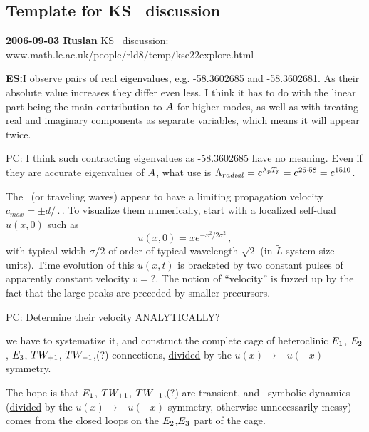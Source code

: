 \subsection{Template for KS \eqva\ discussion}

\noindent
{\bf 2006-09-03 Ruslan}
KS \eqva\ discussion:
\\
{www.math.le.ac.uk/people/rld8/temp/kse22explore.html}

{\bf ES:}{I observe pairs of real eigenvalues,
e.g. -58.3602685 and -58.3602681. As their absolute
value increases they differ even less.
I think it has to do with the linear part being the main
contribution to $A$ for higher modes, as well as
with treating real and imaginary components
as separate variables, which means it will appear twice.
        }

PC: {I think such contracting eigenvalues as -58.3602685 have no meaning.
Even if they are accurate eigenvalues of $A$,
what use is
$\Lambda_{radial} =  e^{\lambda_p {T_{p}}} = e^{26\cdot58} = e^{1510}$.
        }

The \reqva\ (or traveling waves) appear to have a limiting propagation
velocity $c_{max} = \pm d/\period{}$.
To visualize them numerically,
start with a localized self-dual $u(x,0)$ such as
\[
u(x,0) = x e^{- x^2/2\sigma^2}
\,,
\]
with typical width $\sigma/2$ of order of typical wavelength
$\sqrt{2}$ (in $\tilde{L}$ system size units).
Time evolution of this  $u(x,t)$ is bracketed by two constant
pulses of apparently constant velocity $v=?$.
The notion of ``velocity''
is fuzzed up by the fact that the large peaks are preceded
by smaller precursors.

PC: {Determine their velocity ANALYTICALLY?}

we have to systematize it, and
construct the complete cage of heteroclinic $E_{1}$, $E_{2}$, $E_{3}$,
$TW_{+1}$,
$TW_{-1}$,(?)
connections, \underline{divided} by the $u(x) \to - u(-x)$ symmetry.

The hope is that $E_{1}$,
$TW_{+1}$,
$TW_{-1}$,(?) are transient, and \rpo\ symbolic
dynamics (\underline{divided} by the $u(x) \to - u(-x)$ symmetry, otherwise
unnecessarily messy) comes from the closed loops on
the $E_{2}$,$E_{3}$ part of the cage.



